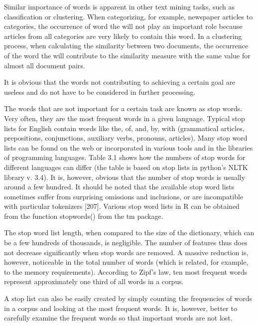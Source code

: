 \documentclass[11pt,openany,executivepaper]{book}
\begin{document}
Similar importance of words is apparent in other text mining tasks, such as classification or clustering. When categorizing, for example, newspaper articles to categories, the occurrence of word the will not play an important role because articles from all categories are very likely to contain this word. In a clustering process, when calculating the similarity between two documents, the occurrence of the word the will contribute to the similarity measure with the same value for almost all document pairs.

It is obvious that the words not contributing to achieving a certain goal are useless and do not have to be considered in further processing.

The words that are not important for a certain task are known as stop words. Very often, they are the most frequent words in a given language. Typical stop lists for English contain words like the, of, and, by, with (grammatical articles, prepositions, conjunctions, auxiliary verbs, pronouns, articles). Many stop word lists can be found on the web or incorporated in various tools and in the libraries of programming languages. Table 3.1 shows how the numbers of stop words for different languages can differ (the table is based on stop lists in python's NLTK library v. 3.4). It is, however, obvious that the number of stop words is usually around a few hundred. It should be noted that the available stop word lists sometimes suffer from surprising omissions and inclusions, or are incompatible with particular tokenizers [207]. Various stop word lists in R can be obtained from the function stopwords() from the tm package.

The stop word list length, when compared to the size of the dictionary, which can be a few hundreds of thousands, is negligible. The number of features thus does not decrease significantly when stop words are removed. A massive reduction is, however, noticeable in the total number of words (which is related, for example, to the memory requirements). According to Zipf's law, ten most frequent words represent approximately one third of all words in a corpus.

A stop list can also be easily created by simply counting the frequencies of words in a corpus and looking at the most frequent words. It is, however, better to carefully examine the frequent words so that important words are not lost.
\end{document}
